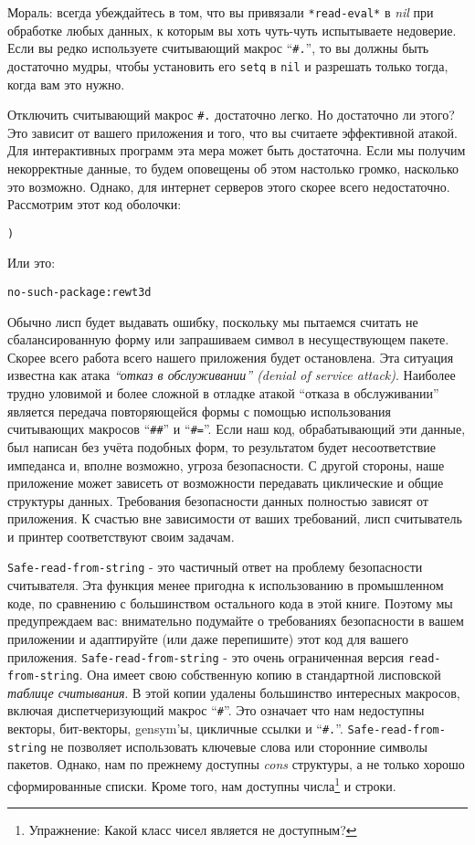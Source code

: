 Мораль: всегда убеждайтесь в том, что вы привязали \verb"*read-eval*" в \emph{nil} при обработке любых данных, к которым вы хоть чуть-чуть испытываете недоверие. Если вы редко используете считывающий макрос ``\verb"#."'', то вы должны быть достаточно мудры, чтобы установить его \verb"setq" в \verb"nil" и разрешать только тогда, когда вам это нужно.

Отключить считывающий макрос \verb"#." достаточно легко. Но достаточно ли этого? Это зависит от вашего приложения и того, что вы считаете эффективной атакой. Для интерактивных программ эта мера может быть достаточна. Если мы получим некорректные данные, то будем оповещены об этом настолько громко, насколько это возможно. Однако, для интернет серверов этого скорее всего недостаточно. Рассмотрим этот код оболочки:

\begin{verbatim}
)
\end{verbatim}

Или это:

\begin{verbatim}
no-such-package:rewt3d
\end{verbatim}

Обычно лисп будет выдавать ошибку, поскольку мы пытаемся считать не сбалансированную форму или запрашиваем символ в несуществующем пакете. Скорее всего работа всего нашего приложения будет остановлена. Эта ситуация известна как атака \emph{``отказ в обслуживании'' (denial of service attack)}. Наиболее трудно уловимой и более сложной в отладке атакой ``отказа в обслуживании'' является передача повторяющейся формы с помощью использования считывающих макросов ``\verb"##"'' и ``\verb"#="''. Если наш код, обрабатывающий эти данные, был написан без учёта подобных форм, то результатом будет несоответствие импеданса и, вполне возможно, угроза безопасности. С другой стороны, наше приложение может зависеть от возможности передавать циклические и общие структуры данных. Требования безопасности данных полностью зависят от приложения. К счастью вне зависимости от ваших требований, лисп считыватель и принтер соответствуют своим задачам.

\verb"Safe-read-from-string" - это частичный ответ на проблему безопасности считывателя. Эта функция менее пригодна к использованию в промышленном коде, по сравнению с большинством остального кода в этой книге. Поэтому мы предупреждаем вас: внимательно подумайте о требованиях безопасности в вашем приложении и адаптируйте (или даже перепишите) этот код для вашего приложения. \verb"Safe-read-from-string" - это очень ограниченная версия \verb"read-from-string". Она имеет свою собственную копию в стандартной лисповской \emph{таблице считывания}. В этой копии удалены большинство интересных макросов, включая диспетчеризующий макрос ``\verb"#"''. Это означает что нам недоступны векторы, бит-векторы, gensym'ы, цикличные ссылки и ``\verb"#."''. \verb"Safe-read-from-string" не позволяет использовать ключевые слова или сторонние символы пакетов. Однако, нам по прежнему доступны \emph{cons} структуры, а не только хорошо сформированные списки. Кроме того, нам доступны числа\footnote{Упражнение: Какой класс чисел является не доступным?} и строки.

